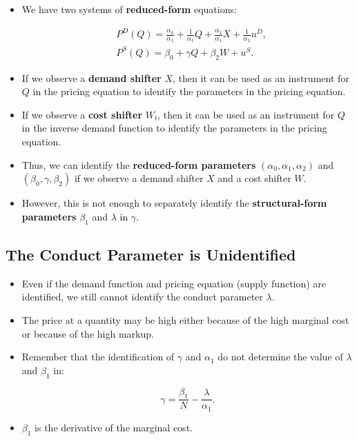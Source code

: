 \documentclass[]{book}
\providecommand{\tightlist}{%
  \setlength{\itemsep}{0pt}\setlength{\parskip}{0pt}}
\begin{document}
\begin{itemize}
\tightlist
\item
  We have two systems of \textbf{reduced-form} equations:

  \begin{equation}
  \begin{split}
  &P^D(Q) = \frac{\alpha_0}{\alpha_1} + \frac{1}{\alpha_1}Q + \frac{\alpha_2}{\alpha_1} X + \frac{1}{\alpha_1}u^D,\\
  &P^S(Q) = \beta_0 + \gamma Q + \beta_2 W + u^S.
  \end{split}
  \end{equation}
\item
  If we observe a \textbf{demand shifter} \(X\), then it can be used as
  an instrument for \(Q\) in the pricing equation to identify the
  parameters in the pricing equation.
\item
  If we observe a \textbf{cost shifter} \(W_t\), then it can be used as
  an instrument for \(Q\) in the inverse demand function to identify the
  parameters in the pricing equation.
\item
  Thus, we can identify the \textbf{reduced-form parameters}
  \((\alpha_0, \alpha_1, \alpha_2)\) and \((\beta_0, \gamma, \beta_2)\)
  if we observe a demand shifter \(X\) and a cost shifter \(W\).
\item
  However, this is not enough to separately identify the
  \textbf{structural-form parameters} \(\beta_1\) and \(\lambda\) in
  \(\gamma\).
\end{itemize}

\subsection{The Conduct Parameter is
Unidentified}\label{the-conduct-parameter-is-unidentified}

\begin{itemize}
\tightlist
\item
  Even if the demand function and pricing equation (supply function) are
  identified, we still cannot identify the conduct parameter
  \(\lambda\).
\item
  The price at a quantity may be high either because of the high
  marginal cost or because of the high markup.
\item
  Remember that the identification of \(\gamma\) and \(\alpha_1\) do not
  determine the value of \(\lambda\) and \(\beta_1\) in:

  \begin{equation}
  \gamma = \frac{\beta_1}{N} - \frac{\lambda}{\alpha_1}.
  \end{equation}
\item
  \(\beta_1\) is the derivative of the marginal cost.
\end{itemize}
\end{document}
